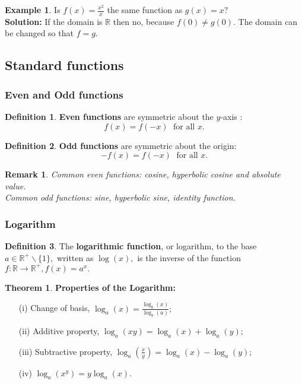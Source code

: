 \documentclass[12pt, a4paper]{article}
\newcommand{\bb}[1]{\mathbb{#1}}
\newcommand{\f}[2]{\frac{#1}{#2}}
\newtheorem*{remark}{Remark}
\theoremstyle{definition}
\newtheorem{definition}{Definition}[section]
\newtheorem{theorem}{Theorem}[section]
\newtheorem*{example}{Example}
\theoremstyle{plain}
\begin{document}
\begin{example}
Is $f(x)=\f{x^2}{x}$ the same function as $g(x)=x?$\\
\textbf{Solution:} If the domain is $\bb{R}$ then no, because $f(0)\neq g(0).$ The domain can be changed so that $f=g.$
\end{example}

\subsection{Standard functions}

\subsubsection{Even and Odd functions}

\begin{definition}
\textbf{Even functions} are symmetric about the $y$-axis : $$f(x)=f(-x)\; \text{ for all } x.$$
\end{definition}

\begin{definition}
\textbf{Odd functions} are symmetric about the origin: $$-f(x)=f(-x) \; \text{ for all } x.$$
\end{definition}

\begin{remark}
Common even functions: cosine, hyperbolic cosine and absolute value. \\
Common odd functions: sine, hyperbolic sine, identity function.
\end{remark}

\subsubsection{Logarithm}

\begin{definition}
The \textbf{logarithmic function}, or logarithm, to the base $a \in \bb{R}^+ \backslash \{1\},$ written as $\log(x),$ is the inverse of the function $f :\bb{R}\to \bb{R}^+, f(x)=a^x.$
\end{definition}

\begin{theorem}
\textbf{Properties of the Logarithm:}
\begin{enumerate}
	
	\item[(i)] Change of basis, $\log_a(x)=\f{\log_b(x)}{\log_b(a)};$
	\item[(ii)] Additive property, $\log_a(xy)=\log_a(x)+\log_a(y);$
	\item[(iii)] Subtractive property, $\log_a(\f{x}{y})=\log_a(x)-\log_a(y);$
	\item[(iv)] $\log_a(x^y)=y\log_a(x).$

\end{enumerate}
\end{theorem}
\end{document}
